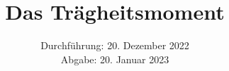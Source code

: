 

\subject{\texorpdfstring{\vspace{2ex}}{}101\texorpdfstring{\vspace{-2ex}}{}} %
\title{Das Trägheitsmoment} %
\date{
	Durchführung: 20. Dezember 2022 %
	\\ Abgabe: 20. Januar 2023 %
}




\maketitle
{}

\thispagestyle{empty}
\tableofcontents
\newpage






\printbibliography{}


